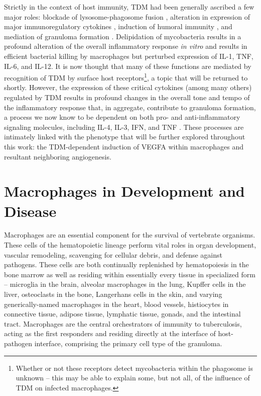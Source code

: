 Strictly in the context of host immunity, TDM had been generally ascribed a few major roles: blockade of lysosome-phagosome fusion \citep{Indrigo2003, Patin2017b, Axelrod2008}, alteration in expression of major immunoregulatory cytokines \citep{Indrigo2002, Bowdish2009, Perez2000}, induction of humoral immunity \citep{Ryll2001, Fujiwara1999, Fujita2005}, and mediation of granuloma formation \citep{Bekierkunst1968, Hunter2006b, Lee2012}. Delipidation of mycobacteria results in a profound alteration of the overall inflammatory response \textit{in vitro} and results in efficient bacterial killing by macrophages but perturbed expression of IL-1\textbeta, TNF\textalpha, IL-6, and IL-12. It is now thought that many of these functions are mediated by recognition of TDM by surface host receptors\footnote{Whether or not these receptors detect mycobacteria within the phagosome is unknown -- this may be able to explain some, but not all, of the influence of TDM on infected macrophages.}, a topic that will be returned to shortly. However, the expression of these critical cytokines (among many others) regulated by TDM results in profound changes in the overall tone and tempo of the inflammatory response that, in aggregate, contribute to granuloma formation, a process we now know to be dependent on both pro- and anti-inflammatory signaling molecules, including IL-4, IL-3, IFN\textgamma, and TNF\textalpha{} \citep{Cronan2021, Cavalcanti2012, Flynn1993, Cooper1993, Kaneko1999, Bergeron1997}. These processes are intimately linked with the phenotype that will be further explored throughout this work: the TDM-dependent induction of VEGFA within macrophages and resultant neighboring angiogenesis.

\section{Macrophages in Development and Disease}\label{macrophages}

Macrophages are an essential component for the survival of vertebrate organisms. These cells of the hematopoietic lineage perform vital roles in organ development, vascular remodeling, scavenging for cellular debris, and defense against pathogens. These cells are both continually replenished by hematopoiesis in the bone marrow as well as residing within essentially every tissue in specialized form -- microglia in the brain, alveolar macrophages in the lung, Kupffer cells in the liver, osteoclasts in the bone, Langerhans cells in the skin, and varying generically-named macrophages in the heart, blood vessels, histiocytes in connective tissue, adipose tissue, lymphatic tissue, gonads, and the intestinal tract. Macrophages are the central orchestrators of immunity to tuberculosis, acting as the first responders and residing directly at the interface of host-pathogen interface, comprising the primary cell type of the granuloma. 

